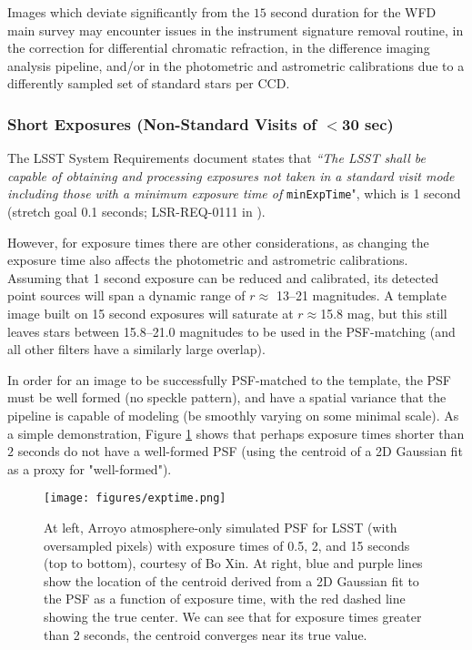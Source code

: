 \documentclass[DM,lsstdoc,toc]{lsstdoc}
\begin{document}
Images which deviate significantly from the $15$ second duration for the WFD main survey may encounter issues in the instrument signature removal routine, in the correction for differential chromatic refraction, in the difference imaging analysis pipeline, and/or in the photometric and astrometric calibrations due to a differently sampled set of standard stars per CCD.


\subsubsection{Short Exposures (Non-Standard Visits of $<$30 sec)}
The LSST System Requirements document states that {\it ``The LSST shall be capable of obtaining and processing exposures not taken in a standard visit mode including those with a minimum exposure time of} {\tt minExpTime}", which is 1 second (stretch goal 0.1 seconds; LSR-REQ-0111 in ).

However, for exposure times there are other considerations, as changing the exposure time also affects the photometric and astrometric calibrations.
Assuming that 1 second exposure can be reduced and calibrated, its detected point sources will span a dynamic range of $r$$\approx$ 13--21 magnitudes.
A template image built on 15 second exposures will saturate at $r$$\approx$15.8 mag, but this still leaves stars between 15.8--21.0 magnitudes to be used in the PSF-matching (and all other filters have a similarly large overlap).

In order for an image to be successfully PSF-matched to the template, the PSF must be well formed (no speckle pattern), and have a spatial variance that the pipeline is capable of modeling (be smoothly varying on some minimal scale).
As a simple demonstration, Figure \ref{fig:expt} shows that perhaps exposure times shorter than $2$ seconds do not have a well-formed PSF (using the centroid of a 2D Gaussian fit as a proxy for "well-formed").

\begin{figure}
\begin{center}
\texttt{[image: figures/exptime.png]}
\caption{At left, Arroyo atmosphere-only simulated PSF for LSST (with oversampled pixels) with exposure times of 0.5, 2, and 15 seconds (top to bottom), courtesy of Bo Xin. At right, blue and purple lines show the location of the centroid derived from a 2D Gaussian fit to the PSF as a function of exposure time, with the red dashed line showing the true center. We can see that for exposure times greater than 2 seconds, the centroid converges near its true value. \label{fig:expt}}
\end{center}
\end{figure}
\end{document}
